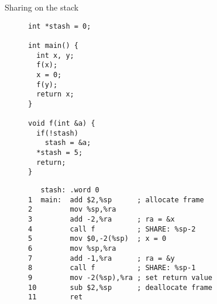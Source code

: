 \documentclass[acmsmall,review,anonymous]{acmart}\settopmatter{printfolios=true,printccs=false,printacmref=false}
\begin{document}
\begin{figure}
\begin{subfigure}{.65\textwidth}
\vspace{\abovedisplayskip}

\end{subfigure}

\caption{Sharing on the stack \ifaftersubmission{}\fi}
\label{fig:passingsimple}
\end{figure}

\begin{figure}
  \centering
  \begin{subfigure}{.2\textwidth}
{\small
\begin{verbatim}
int *stash = 0;

int main() {
  int x, y;
  f(x);
  x = 0;
  f(y);
  return x;
}

void f(int &a) {
  if(!stash)
    stash = &a;
  *stash = 5;
  return;
}
\end{verbatim}
}
  \end{subfigure}
  \begin{subfigure}{.49\textwidth}
{\small
\begin{verbatim}
   stash: .word 0
1  main:  add $2,%sp      ; allocate frame
2         mov %sp,%ra
3         add -2,%ra      ; ra = &x
4         call f          ; SHARE: %sp-2
5         mov $0,-2(%sp)  ; x = 0
6         mov %sp,%ra
7         add -1,%ra      ; ra = &y
8         call f          ; SHARE: %sp-1
9         mov -2(%sp),%ra ; set return value
10        sub $2,%sp      ; deallocate frame
11        ret


\end{verbatim}}
\end{subfigure}
\end{figure}
\end{document}
